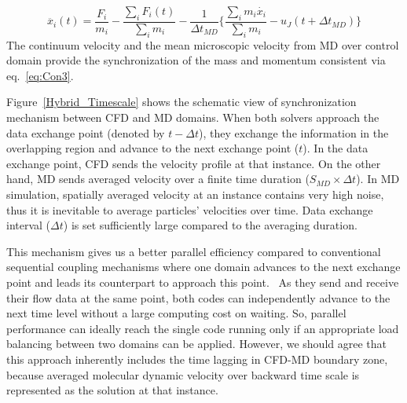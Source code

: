 \documentclass[conference,final]{IEEEtran}
\begin{document}
\vspace{-.2em}
\begin{equation}
 \ddot{x_{i}}(t) = \frac{F_{i}}{m_{i}} -  \frac{\displaystyle\sum_{i}F_{i}(t)} {\displaystyle\sum_{i}m_{i}} - \frac{1}{\Delta t_{MD}} \{  \frac{\displaystyle\sum_{i}m_{i}\dot{x_{i}}} {\displaystyle\sum_{i}m_{i}} - u_{J}(t + \Delta t_{MD})\}
 \label{eq:Con3}
\end{equation}
\normalsize
The continuum velocity and the mean microscopic velocity from MD over control domain provide the synchronization of the mass and momentum consistent via eq.~\ref{eq:Con3}.



Figure~\ref{Hybrid_Timescale} shows the schematic view of synchronization mechanism between CFD and MD domains. When both solvers approach the data exchange point (denoted by $t-{\Delta}t$), they exchange the information in the overlapping region and advance to the next exchange point ($t$). In the data exchange point, CFD sends the velocity profile at that instance. On the other hand, MD sends averaged velocity over a finite time duration ($S_{MD}{\times}{\Delta}t$). In MD simulation, spatially averaged velocity at an instance contains very high noise, thus it is inevitable to average particles' velocities over time. Data exchange interval (${\Delta}t$) is set sufficiently large compared to the averaging duration.

This mechanism gives us a better parallel efficiency compared to conventional sequential coupling mechanisms where one domain advances to the next exchange point and leads its counterpart to approach this point.~\cite{Time_Mechanism} As they send and receive their flow data at the same point, both codes can independently advance to the next time level without a large computing cost on waiting. So, parallel performance can ideally reach the single code running only if an appropriate load balancing between two domains can be applied. However, we should agree that this approach inherently includes the time lagging in CFD-MD boundary zone, because averaged molecular dynamic velocity over backward time scale is represented as the solution at that instance.
\end{document}
